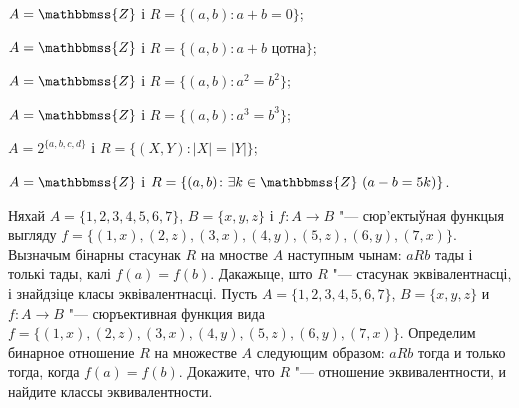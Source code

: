 \begin{problemList}
{\begin{belarusianEnumerate}
\item $A = \mathbbmss{Z}$ і $R = \{(a, b) \colon a + b = 0\}$;
\item $A = \mathbbmss{Z}$ і $R = \{(a, b) \colon a + b \,\,\text{цотна}\}$;
\item $A = \mathbbmss{Z}$ і $R = \{(a, b) \colon a^2 = b^2\}$;
\item $A = \mathbbmss{Z}$ і $R = \{(a, b) \colon a^3 = b^3\}$;
\item $A = 2^{\{a, b, c, d\}}$ і $R = \{(X, Y) \colon |X| = |Y|\}$;
\item $A = \mathbbmss{Z}$ і $R = \{(a, b) \colon \exists k \in \mathbbmss{Z} \,\, (a - b = 5k)\}$.
	
\end{belarusianEnumerate}
}

\bigskip

\problemItemSimple
{Няхай $A = \{1, 2, 3, 4, 5, 6, 7\}$, $B = \{x, y, z\}$ і $f \colon A \to B$ "--- сюр'ектыўная функцыя выгляду $f = \{(1, x), (2, z), (3, x), (4, y), (5, z), (6, y), (7, x)\}$.
Вызначым бінарны стасунак $R$ на мностве $A$ наступным чынам: $aRb$ тады і толькі тады, калі $f(a) = f(b)$. Дакажыце, што $R$ "---  стасунак эквівалентнасці, і знайдзіце класы эквівалентнасці.}
{Пусть $A = \{1, 2, 3, 4, 5, 6, 7\}$, $B = \{x, y, z\}$ и $f \colon A \to B$ "---
сюръективная функция вида $f = \{(1, x), (2, z), (3, x), (4, y), (5, z), (6, y), (7, x)\}$.
Определим бинарное отношение $R$ на множестве $A$ следующим образом: $aRb$ тогда и только тогда, когда $f(a) = f(b)$. Докажите, что $R$ "--- отношение эквивалентности, и найдите классы эквивалентности.}
	
\end{problemList}

